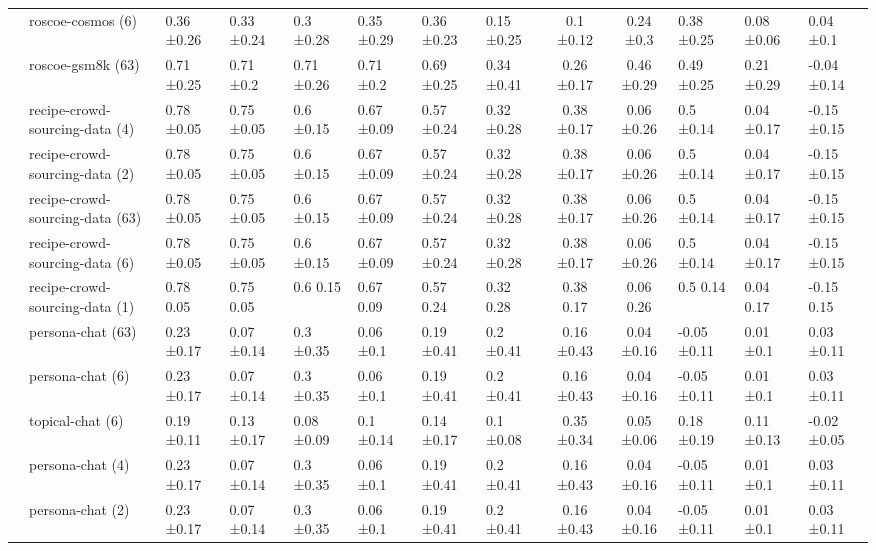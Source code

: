 \begin{tabular}{llllllll|cc}
 & roscoe-cosmos (6) & 0.36 ±0.26 & 0.33 ±0.24 & 0.3 ±0.28 & 0.35 ±0.29 & 0.36 ±0.23 & 0.15 ±0.25 & 0.1 ±0.12 & 0.24 ±0.3 & 0.38 ±0.25 & 0.08 ±0.06 & 0.04 ±0.1 \\
 & roscoe-gsm8k (63) & 0.71 ±0.25 & 0.71 ±0.2 & 0.71 ±0.26 & 0.71 ±0.2 & 0.69 ±0.25 & 0.34 ±0.41 & 0.26 ±0.17 & 0.46 ±0.29 & 0.49 ±0.25 & 0.21 ±0.29 & -0.04 ±0.14 \\
 & recipe-crowd-sourcing-data (4) & 0.78 ±0.05 & 0.75 ±0.05 & 0.6 ±0.15 & 0.67 ±0.09 & 0.57 ±0.24 & 0.32 ±0.28 & 0.38 ±0.17 & 0.06 ±0.26 & 0.5 ±0.14 & 0.04 ±0.17 & -0.15 ±0.15 \\
 & recipe-crowd-sourcing-data (2) & 0.78 ±0.05 & 0.75 ±0.05 & 0.6 ±0.15 & 0.67 ±0.09 & 0.57 ±0.24 & 0.32 ±0.28 & 0.38 ±0.17 & 0.06 ±0.26 & 0.5 ±0.14 & 0.04 ±0.17 & -0.15 ±0.15 \\
 & recipe-crowd-sourcing-data (63) & 0.78 ±0.05 & 0.75 ±0.05 & 0.6 ±0.15 & 0.67 ±0.09 & 0.57 ±0.24 & 0.32 ±0.28 & 0.38 ±0.17 & 0.06 ±0.26 & 0.5 ±0.14 & 0.04 ±0.17 & -0.15 ±0.15 \\
 & recipe-crowd-sourcing-data (6) & 0.78 ±0.05 & 0.75 ±0.05 & 0.6 ±0.15 & 0.67 ±0.09 & 0.57 ±0.24 & 0.32 ±0.28 & 0.38 ±0.17 & 0.06 ±0.26 & 0.5 ±0.14 & 0.04 ±0.17 & -0.15 ±0.15 \\
 & recipe-crowd-sourcing-data (1) & 0.78 0.05 & 0.75 0.05 & 0.6 0.15 & 0.67 0.09 & 0.57 0.24 & 0.32 0.28 & 0.38 0.17 & 0.06 0.26 & 0.5 0.14 & 0.04 0.17 & -0.15 0.15 \\
 & persona-chat (63) & 0.23 ±0.17 & 0.07 ±0.14 & 0.3 ±0.35 & 0.06 ±0.1 & 0.19 ±0.41 & 0.2 ±0.41 & 0.16 ±0.43 & 0.04 ±0.16 & -0.05 ±0.11 & 0.01 ±0.1 & 0.03 ±0.11 \\
 & persona-chat (6) & 0.23 ±0.17 & 0.07 ±0.14 & 0.3 ±0.35 & 0.06 ±0.1 & 0.19 ±0.41 & 0.2 ±0.41 & 0.16 ±0.43 & 0.04 ±0.16 & -0.05 ±0.11 & 0.01 ±0.1 & 0.03 ±0.11 \\
 & topical-chat (6) & 0.19 ±0.11 & 0.13 ±0.17 & 0.08 ±0.09 & 0.1 ±0.14 & 0.14 ±0.17 & 0.1 ±0.08 & 0.35 ±0.34 & 0.05 ±0.06 & 0.18 ±0.19 & 0.11 ±0.13 & -0.02 ±0.05 \\
 & persona-chat (4) & 0.23 ±0.17 & 0.07 ±0.14 & 0.3 ±0.35 & 0.06 ±0.1 & 0.19 ±0.41 & 0.2 ±0.41 & 0.16 ±0.43 & 0.04 ±0.16 & -0.05 ±0.11 & 0.01 ±0.1 & 0.03 ±0.11 \\
 & persona-chat (2) & 0.23 ±0.17 & 0.07 ±0.14 & 0.3 ±0.35 & 0.06 ±0.1 & 0.19 ±0.41 & 0.2 ±0.41 & 0.16 ±0.43 & 0.04 ±0.16 & -0.05 ±0.11 & 0.01 ±0.1 & 0.03 ±0.11 \\

\end{tabular}
